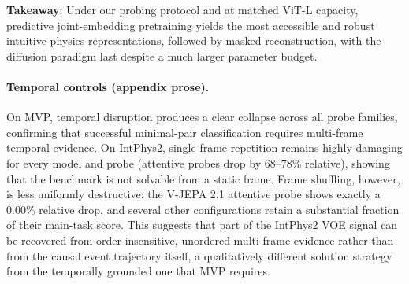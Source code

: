 \begin{takeawaybox}
\textbf{Takeaway}:
Under our probing protocol and at matched ViT-L capacity, predictive
joint-embedding pretraining yields the most accessible and robust
intuitive-physics representations, followed by masked reconstruction, with the
diffusion paradigm last despite a much larger parameter budget.
\end{takeawaybox}



\paragraph{Temporal controls (appendix prose).}
On MVP, temporal disruption produces a clear collapse across all probe
families, confirming that successful minimal-pair classification requires
multi-frame temporal evidence. On IntPhys2, single-frame repetition remains
highly damaging for every model and probe (attentive probes drop by 68--78\%
relative), showing that the benchmark is not solvable from a static frame.
Frame shuffling, however, is less uniformly destructive: the V-JEPA 2.1
attentive probe shows exactly a 0.00\% relative drop, and several other
configurations retain a substantial fraction of their main-task score. This
suggests that part of the IntPhys2 VOE signal can be recovered from
order-insensitive, unordered multi-frame evidence rather than from the causal
event trajectory itself, a qualitatively different solution strategy from the
temporally grounded one that MVP requires.
